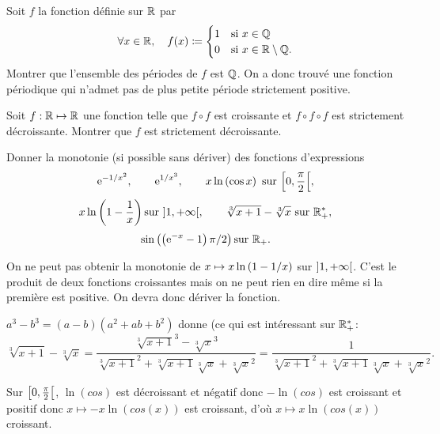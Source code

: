 \documentclass{magnolia}
\begin{document}
Soit $f$ la fonction définie sur $\mathbb{R}$ par
\[\forall x\in\mathbb{R} ,\quad
  f(x)\coloneqq
  \begin{cases}
  1 & \text{si $x\in\mathbb{Q}$}\\
  0 & \text{si $x\in\mathbb{R}\setminus\mathbb{Q}$.}  
  \end{cases}\]
Montrer que l'ensemble des périodes de $f$ est $\mathbb{Q}$. On a donc trouvé une
fonction périodique qui n'admet pas de plus petite période strictement positive.



Soit $f:\mathbb{R}\mapsto\mathbb{R}$ une fonction telle que $f\circ f$ est croissante et
$f\circ f\circ f$ est strictement décroissante. Montrer que $f$ est
strictement décroissante.




Donner la monotonie (si possible sans dériver) des fonctions d'expressions
\[{\rm e}^{-1/x^2}, \qquad {\rm e}^{1/x^3}, \qquad x \ln\left(\cos x\right)
  \ \text{sur $\left[0,\frac{\pi}{2}\right[$},\]
\[x\ln\left(1-\frac{1}{x}\right) \text{sur $\left]1,+\infty\right[$},\qquad
  \sqrt[3]{x+1}-\sqrt[3]{x} \text{ sur $\mathbb{R}_+^*$},\]
\[\sin\left(\left({\rm e}^{-x}-1\right)\pi/2\right) \text{sur $\mathbb{R}_+$.}\]
\begin{sol}
On ne peut pas obtenir la monotonie de
$x\mapsto x \ln\left(1-1/x\right)$ sur $\left]1,+\infty\right[$.
C'est le produit de deux fonctions croissantes mais on ne peut rien en dire même si la première est positive. On devra donc dériver la fonction.

$a^3-b^3=(a-b)(a^2+ab+b^2)$ donne (ce qui est intéressant sur $\mathbb{R}_+^*$:
$$\sqrt[3]{x+1}-\sqrt[3]{x}=\frac{\sqrt[3]{x+1}^3-\sqrt[3]{x}^3}{\sqrt[3]{x+1}^2+\sqrt[3]{x+1}\sqrt[3]{x}+\sqrt[3]{x}^2}=\frac{1}{\sqrt[3]{x+1}^2+\sqrt[3]{x+1}\sqrt[3]{x}+\sqrt[3]{x}^2}.$$

Sur $\left[0,\frac{\pi}{2}\right[$, $\ln(cos)$ est décroissant et négatif donc $-\ln(cos)$ est croissant et positif donc $x\mapsto -x\ln(cos(x))$ est croissant, d'où $x\mapsto x\ln(cos(x))$ croissant.

\end{sol}





\end{document}
